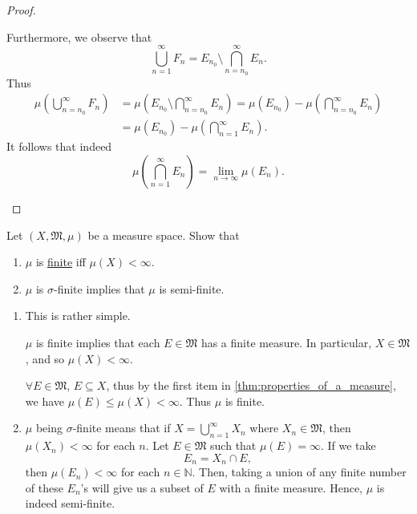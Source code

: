 \documentclass[notoc,notitlepage]{tufte-book}
\begin{document}
\begin{proof}
\begin{enumerate}
      Furthermore, we observe that
      \begin{equation*}
        \bigcup_{n=1}^{\infty} F_n = E_{n_0} \setminus \bigcap_{n=n_0}^{\infty} E_n.
      \end{equation*}
      Thus
      \begin{align*}
        \mu \left( \bigcup_{n=n_0}^{\infty} F_n \right)
        &= \mu \left( E_{n_0} \setminus \bigcap_{n=n_0}^{\infty} E_n \right)
        = \mu(E_{n_0}) - \mu \left( \bigcap_{n=n_0}^{\infty} E_n \right) \\
        &= \mu(E_{n_0}) - \mu \left( \bigcap_{n=1}^{\infty} E_n \right).
      \end{align*}
      It follows that indeed
      \begin{equation*}
        \mu \left( \bigcap_{n=1}^{\infty} E_n \right)
        = \lim_{n \to \infty} \mu(E_n).
      \end{equation*}
  \end{enumerate}
\end{proof}

\begin{ex}
  Let $(X, \mathfrak{M}, \mu)$ be a measure space.
  Show that
  \begin{enumerate}
    \item $\mu$ is
      \hyperref[defn:finitivity_sigma_finitivity_and_semi_finitivity_of_a_measure]{finite}
      iff $\mu(X) < \infty$.
    \item $\mu$ is $\sigma$-finite implies that $\mu$ is semi-finite.
  \end{enumerate}
\end{ex}

\begin{solution}
  \begin{enumerate}
    \item This is rather simple.

      \hlbnoted{$(\implies)$} $\mu$ is finite implies that each $E \in \mathfrak{M}$
      has a finite measure. In particular, $X \in \mathfrak{M}$,
      and so $\mu(X) < \infty$.

      \hlbnoted{$(\impliedby)$} $\forall E \in \mathfrak{M}$, $E \subseteq X$, 
      thus by the first item in \cref{thm:properties_of_a_measure},
      we have $\mu(E) \leq \mu(X) < \infty$. Thus $\mu$ is finite.

    \item $\mu$ being $\sigma$-finite means that if $X = \bigcup_{n=1}^{\infty}
      X_n$ where $X_n \in \mathfrak{M}$, then $\mu(X_n) < \infty$ for each $n$.
      Let $E \in \mathfrak{M}$ such that $\mu(E) = \infty$.
      If we take
      \begin{equation*}
        E_n = X_n \cap E,
      \end{equation*}
      then $\mu(E_n) < \infty$ for each $n \in \mathbb{N}$.
      Then, taking a union of any finite number of these $E_n$'s
      will give us a subset of $E$ with a finite measure.
      Hence, $\mu$ is indeed semi-finite.
  \end{enumerate}
\end{solution}
\end{document}
